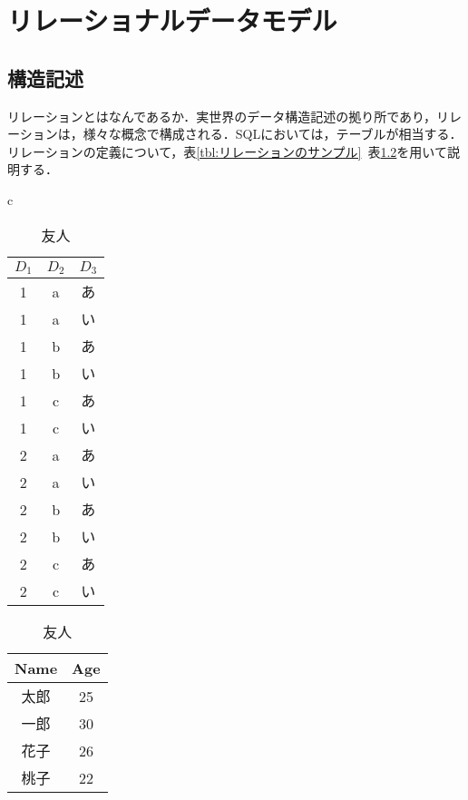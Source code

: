 \documentclass[a4paper,10pt]{jreport}
\begin{document}

\chapter{リレーショナルデータモデル} %
\label{cha:リレーショナルデータモデル}
\section{構造記述}
リレーションとはなんであるか．実世界のデータ構造記述の拠り所であり，リレーションは，様々な概念で構成される．SQLにおいては，テーブルが相当する．リレーションの定義について，表\ref{tbl:リレーションのサンプル}~表\ref{tbl:友人}を用いて説明する．

\begin{table}[htp]
	\begin{center}
		\begin{tabular}{c}
			\begin{minipage}{0.5\hsize}
				\begin{center}
					\caption{リレーションのサンプル}
					\label{tbl:リレーションのサンプル}
					\begin{tabular}{|c|c|c|} \hline
						$D_1$ & $D_2$ & $D_3$ \\ \hline \hline
						1 & a & あ \\ \hline
						1 & a & い \\ \hline
						1 & b & あ \\ \hline
						1 & b & い \\ \hline
						1 & c & あ \\ \hline
						1 & c & い \\ \hline
						2 & a & あ \\ \hline
						2 & a & い \\ \hline
						2 & b & あ \\ \hline
						2 & b & い \\ \hline
						2 & c & あ \\ \hline
						2 & c & い \\ \hline
					\end{tabular}
				\end{center}
			\end{minipage}
			\begin{minipage}{0.5\hsize}
				\begin{center}
					\caption{友人}
					\label{tbl:友人}
					\begin{tabular}{|c|c|}\hline
						Name & Age \\ \hline \hline
						太郎 & 25 \\ \hline
						一郎 & 30 \\ \hline
						花子 & 26 \\ \hline
						桃子 & 22 \\ \hline
					\end{tabular}
				\end{center}
			\end{minipage}
		\end{tabular}
	\end{center}
\end{table}
\end{document}
